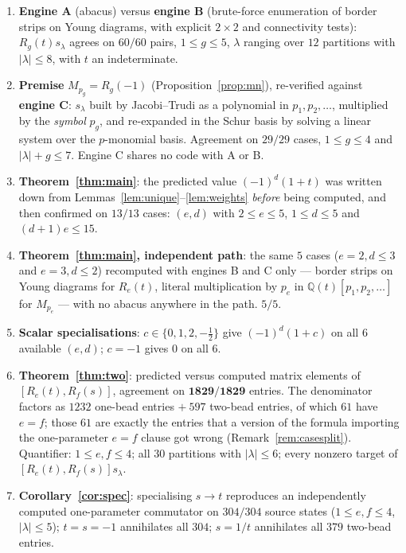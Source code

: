 \documentclass[11pt]{article}
\theoremstyle{definition}
\newcommand{\Q}{\mathbb{Q}}
\begin{document}
\begin{enumerate}
\item \textbf{Engine A} (abacus) versus \textbf{engine B} (brute-force enumeration of
border strips on Young diagrams, with explicit $2\times2$ and connectivity tests):
$R_g(t)s_\lambda$ agrees on $60/60$ pairs, $1\le g\le5$, $\lambda$ ranging over $12$
partitions with $|\lambda|\le8$, with $t$ an indeterminate.
\item \textbf{Premise} $M_{p_g}=R_g(-1)$ (Proposition~\ref{prop:mn}), re-verified against
\textbf{engine C}: $s_\lambda$ built by Jacobi--Trudi as a polynomial in $p_1,p_2,\dots$,
multiplied by the \emph{symbol} $p_g$, and re-expanded in the Schur basis by solving a
linear system over the $p$-monomial basis.  Agreement on $29/29$ cases, $1\le g\le4$ and
$|\lambda|+g\le7$.  Engine C shares no code with A or B.
\item \textbf{Theorem~\ref{thm:main}}: the predicted value $(-1)^d(1+t)$ was written down
from Lemmas~\ref{lem:unique}--\ref{lem:weights} \emph{before} being computed, and then
confirmed on $13/13$ cases: $(e,d)$ with $2\le e\le5$, $1\le d\le5$ and $(d+1)e\le15$.
\item \textbf{Theorem~\ref{thm:main}, independent path}: the same $5$ cases
($e=2,d\le3$ and $e=3,d\le2$) recomputed with engines B and C only --- border strips on
Young diagrams for $R_e(t)$, literal multiplication by $p_e$ in $\Q(t)[p_1,p_2,\dots]$ for
$M_{p_e}$ --- with no abacus anywhere in the path.  $5/5$.
\item \textbf{Scalar specialisations}: $c\in\{0,1,2,-\tfrac12\}$ give $(-1)^d(1+c)$ on all
$6$ available $(e,d)$; $c=-1$ gives $0$ on all $6$.
\item \textbf{Theorem~\ref{thm:two}}: predicted versus computed matrix elements of
$[R_e(t),R_f(s)]$, agreement on $\mathbf{1829/1829}$ entries.  The denominator factors as
$1232$ one-bead entries $+\ 597$ two-bead entries, of which $61$ have $e=f$; those $61$ are
exactly the entries that a version of the formula importing the one-parameter $e=f$ clause
got wrong (Remark~\ref{rem:casesplit}).  Quantifier: $1\le e,f\le4$; all $30$ partitions
with $|\lambda|\le6$; every nonzero target of $[R_e(t),R_f(s)]s_\lambda$.
\item \textbf{Corollary~\ref{cor:spec}}: specialising $s\to t$ reproduces an independently
computed one-parameter commutator on $304/304$ source states ($1\le e,f\le4$,
$|\lambda|\le5$); $t=s=-1$ annihilates all $304$; $s=1/t$ annihilates all $379$ two-bead
entries.
\end{enumerate}
\end{document}
